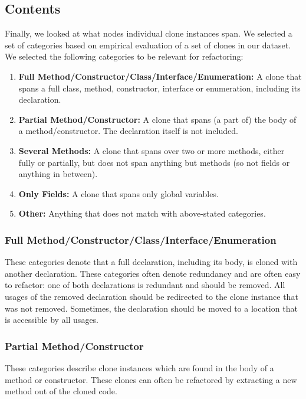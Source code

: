 \documentclass[runningheads]{llncs}
\begin{document}

\subsection{Contents}\label{sec:setupcontents}
Finally, we looked at what nodes individual clone instances span. We selected a set of categories based on empirical evaluation of a set of clones in our dataset. We selected the following categories to be relevant for refactoring:
\begin{enumerate}
  \item \textbf{Full Method/Constructor/Class/Interface/Enumeration:} A clone that spans a full class, method, constructor, interface or enumeration, including its declaration.
  \item \textbf{Partial Method/Constructor:} A clone that spans (a part of) the body of a method/constructor. The declaration itself is not included.
  \item \textbf{Several Methods:} A clone that spans over two or more methods, either fully or partially, but does not span anything but methods (so not fields or anything in between).
  \item \textbf{Only Fields:} A clone that spans only global variables.
  \item \textbf{Other:} Anything that does not match with above-stated categories.
\end{enumerate}

\subsubsection{Full Method/Constructor/Class/Interface/Enumeration}
These categories denote that a full declaration, including its body, is cloned with another declaration. These categories often denote redundancy and are often easy to refactor: one of both declarations is redundant and should be removed. All usages of the removed declaration should be redirected to the clone instance that was not removed. Sometimes, the declaration should be moved to a location that is accessible by all usages. %

\subsubsection{Partial Method/Constructor}
These categories describe clone instances which are found in the body of a method or constructor. These clones can often be refactored by extracting a new method out of the cloned code. %
\end{document}
